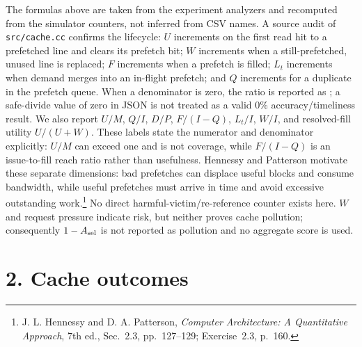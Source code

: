 \documentclass[10pt]{article}
\newcommand{\NA}{\textemdash}
\begin{document}
\begin{infobox}[title={\bfseries Exact interpretation boundaries}]
The formulas above are taken from the experiment analyzers and recomputed from
the simulator counters, not inferred from CSV names.  A source audit of
\texttt{src/cache.cc} confirms the lifecycle: $U$ increments on the first read
hit to a prefetched line and clears its prefetch bit; $W$ increments when a
still-prefetched, unused line is replaced; $F$ increments when a prefetch is
filled; $L_t$ increments when demand merges into an in-flight prefetch; and
$Q$ increments for a duplicate in the prefetch queue.  When a denominator is
zero, the ratio is reported as \NA; a safe-divide value of zero in JSON is not
treated as a valid 0\% accuracy/timeliness result.  We also report
$U/M$, $Q/I$, $D/P$, $F/(I-Q)$, $L_t/I$, $W/I$, and resolved-fill
utility $U/(U+W)$.  These labels state the numerator and denominator
explicitly: $U/M$ can exceed one and is not coverage, while $F/(I-Q)$ is an
issue-to-fill reach ratio rather than usefulness.
Hennessy and Patterson motivate these separate dimensions: bad prefetches can
displace useful blocks and consume bandwidth, while useful prefetches must
arrive in time and avoid excessive outstanding work.\footnote{J. L. Hennessy
and D. A. Patterson, \emph{Computer Architecture: A Quantitative Approach},
7th ed., Sec.~2.3, pp.~127--129; Exercise~2.3, p.~160.}
No direct harmful-victim/re-reference counter exists here.  $W$ and request
pressure indicate risk, but neither proves cache pollution; consequently
$1-A_{\rm sel}$ is not reported as pollution and no aggregate score is used.
\end{infobox}

\section*{2. Cache outcomes}
\begin{center}\scriptsize
{}
\end{center}
\end{document}
